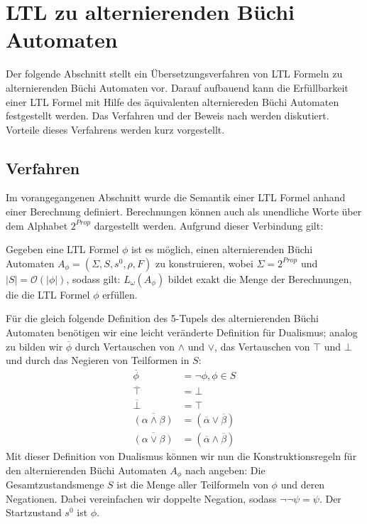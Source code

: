 \section{LTL zu alternierenden Büchi Automaten}

Der folgende Abschnitt stellt ein Übersetzungsverfahren von LTL Formeln zu alternierenden Büchi Automaten vor. Darauf aufbauend kann die Erfüllbarkeit einer LTL Formel mit Hilfe des äquivalenten alterniereden Büchi Automaten festgestellt werden. Das Verfahren und der Beweis nach \cite{vardi+96} werden diskutiert. Vorteile dieses Verfahrens werden kurz vorgestellt. 


\subsection{Verfahren}
\label{subsection:verfahren}
Im vorangegangenen Abschnitt wurde die Semantik einer LTL Formel anhand einer Berechnung definiert. Berechnungen können auch als unendliche Worte über dem Alphabet $2^{Prop}$ dargestellt werden\cite{vardi+96}. Aufgrund dieser Verbindung gilt:
\begin{satz}\cite{vardi+96}
\label{LTL->ABA}
    Gegeben eine LTL Formel $\phi$ ist es möglich, einen alternierenden Büchi Automaten $A_\phi = (\Sigma, S, s^0, \rho, F)$ zu konstruieren, wobei $\Sigma = 2^{Prop}$ und $|S| = \mathcal{O}(|\phi|)$, sodass gilt: $L_\omega(A_\phi)$ bildet exakt die Menge der Berechnungen, die die LTL Formel $\phi$ erfüllen.
\end{satz}
Für die gleich folgende Definition des 5-Tupels des alternierenden Büchi Automaten benötigen wir eine leicht veränderte Definition für Dualismus; analog zu \cite{vardi+96} bilden wir $\overline{\phi}$ durch Vertauschen von $\land$ und $\lor$, das Vertauschen von $\top$ und $\bot$ und durch das Negieren von Teilformen in $S$:
\begin{equation}
\label{aba-zu-ltl:dualismus}
\begin{split}
    \overline{\phi} &= \lnot\phi, \phi \in S\\
    \overline{\top} &= \bot\\
    \overline{\bot} &= \top\\
    \overline{(\alpha \land \beta)} &= (\overline{\alpha} \lor \overline{\beta})\\
    \overline{(\alpha \lor \beta)} &= (\overline{\alpha} \land \overline{\beta})
\end{split}
\end{equation}
Mit dieser Definition von Dualismus können wir nun die Konstruktionsregeln für den alternierenden Büchi Automaten $A_\phi$ nach \cite{vardi+96} angeben: Die Gesamtzustandsmenge $S$ ist die Menge aller Teilformeln von $\phi$ und deren Negationen. Dabei vereinfachen wir doppelte Negation, sodass $\lnot\lnot\psi = \psi$. Der Startzustand $s^0$ ist $\phi$. 
